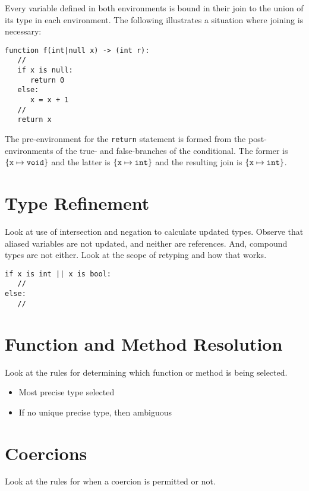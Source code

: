 Every variable defined in both environments is bound in their join to
the union of its type in each environment.  The following illustrates
a situation where joining is necessary:

\begin{lstlisting}
function f(int|null x) -> (int r):
   //
   if x is null:
      return 0
   else:
      x = x + 1
   //
   return x
\end{lstlisting}

The pre-environment for the \lstinline{return} statement is formed
from the post-environments of the true- and false-branches of the
conditional.  The former is ${\tt\{x\mapsto void\}}$ and the latter is
${\tt\{x\mapsto int\}}$ and the resulting join is
${\tt\{x\mapsto int\}}$.

\section{Type Refinement}

Look at use of intersection and negation to calculate updated types.
Observe that aliased variables are not updated, and neither are
references.  And, compound types are not either.  Look at the scope of
retyping and how that works.

\begin{lstlisting}
if x is int || x is bool:
   //
else:
   //
\end{lstlisting}

\section{Function and Method Resolution}
Look at the rules for determining which function or method is being selected.

\begin{itemize}
\item Most precise type selected
\item If no unique precise type, then ambiguous

\end{itemize}


\section{Coercions}
Look at the rules for when a coercion is permitted or not.
